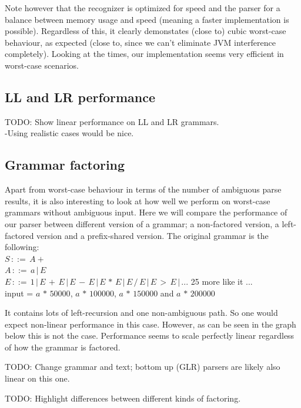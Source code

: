 \documentclass[a4paper,10pt]{article}
\begin{document}
Note however that the recognizer is optimized for speed and the parser for a balance between memory usage and speed (meaning a faster implementation is possible). Regardless of this, it clearly demonstates (close to) cubic worst-case behaviour, as expected (close to, since we can't eliminate JVM interference completely). Looking at the times, our implementation seems very efficient in worst-case scenarios.

\subsection{LL and LR performance}

TODO: Show linear performance on LL and LR grammars.\\
-Using realistic cases would be nice.

\subsection{Grammar factoring}

Apart from worst-case behaviour in terms of the number of ambiguous parse results, it is also interesting to look at how well we perform on worst-case grammars without ambiguous input. Here we will compare the performance of our parser between different version of a grammar; a non-factored version, a left-factored version and a prefix-shared version. The original grammar is the following:\\
$S\,::=\,A+$\\
$A\,::=\,a\,|\,E$\\
$E\,::=\,1\,|\,E\,+\,E\,|\,E\,-\,E\,|\,E\,*\,E\,|\,E\,/\,E\,|\,E\,>\,E\,|\,...$ 25 more like it ...\\
input = $a\,*\,50000$, $a\,*\,100000$, $a\,*\,150000$ and $a\,*\,200000$

It contains lots of left-recursion and one non-ambiguous path. So one would expect non-linear performance in this case. However, as can be seen in the graph below this is not the case. Performance seems to scale perfectly linear regardless of how the grammar is factored.

TODO: Change grammar and text; bottom up (GLR) parsers are likely also linear on this one.

TODO: Highlight differences between different kinds of factoring.
\end{document}

